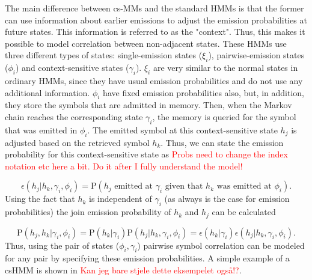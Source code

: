 \documentclass{article}
\begin{document}
The main difference between cs-MMs and the standard HMMs is that the former can use information about earlier emissions to adjust the emission probabilities at future states. This information is referred to as the "context". Thus, this makes it possible to model correlation between non-adjacent states. These HMMs use three different types of states: single-emission states ($\xi_i$),  pairwise-emission states ($\phi_i$) and context-sensitive states ($\gamma_i$). $\xi_i$ are very similar to the normal states in ordinary HMMs, since they have usual emission probabilities and do not use any additional information. $\phi_i$ have fixed emission probabilities also, but, in addition, they store the symbols that are admitted in memory. Then, when the Markov chain reaches the corresponding state $\gamma_i$, the memory is queried for the symbol that was emitted in $\phi_i$. The emitted symbol at this context-sensitive state $h_j$ is adjusted based on the retrieved symbol $h_k$. Thus, we can state the emission probability for this context-sensitive state as \textcolor{red}{Probs need to change the index notation etc here a bit. Do it after I fully understand the model!}

\begin{equation*}
    \epsilon(h_j|h_k, \gamma_i, \phi_i) = \text{P}(h_j\text{ emitted at }\gamma_i\text{ given that }h_k\text{ was emitted at }\phi_i).
\end{equation*}
Using the fact that $h_k$ is independent of $\gamma_i$ (as always is the case for emission probabilities) the join emission probability of $h_k$ and $h_j$ can be calculated

\begin{equation*}
    \text{P}(h_j, h_k|\gamma_i, \phi_i) = \text{P}(h_k|\gamma_i)\text{P}(h_j|h_k, \gamma_i, \phi_i) = \epsilon(h_k|\gamma_i)\epsilon(h_j|h_k, \gamma_i, \phi_i).
\end{equation*}
Thus, using the pair of states ($\phi_i, \gamma_i$) pairwise symbol correlation can be modeled for any pair by specifying these emission probabilities. A simple example of a csHMM is shown in \cite{Yoon2009} \textcolor{red}{Kan jeg bare stjele dette eksempelet også!?}. 
\end{document}
